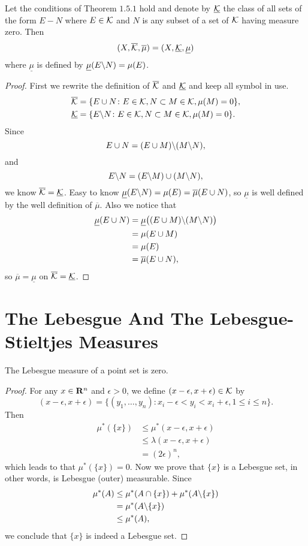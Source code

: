 \begin{pro}%
	Let the conditions of Theorem $1.5.1$ hold and denote by $\underline{\mathcal{K}}$ the class of all sets of the form $E-N$ where $E\in \mathcal{K}$ and $N$ is any subset of a set of $\mathcal{K}$ having measure zero. Then \[(X,\overline{\mathcal{K}},\overline{\mu})=(X,\underline{\mathcal{K}},\underline{\mu})\] where $\underline{\mu}$ is defined by $\underline{\mu}(E\backslash N)=\mu(E)$.
\end{pro}
\begin{proof}
	First we rewrite the definition of $\overline{\mathcal{K}}$ and $\underline{\mathcal{K}}$ and keep all symbol in use.
	\begin{align*}
		\overline{\mathcal{K}}&=\{E\cup N\colon E\in\mathcal{K},N\subset M\in \mathcal{K},\mu(M)=0\},\\
		\underline{\mathcal{K}}&=\{E\backslash N\colon E\in\mathcal{K},N\subset M\in \mathcal{K},\mu(M)=0\}.
	\end{align*}
	Since 
	\[E\cup N=(E\cup M)\backslash(M\backslash N),\]
	and
	\[E\backslash N=(E\backslash M)\cup(M\backslash N),\]
	we know $\overline{\mathcal{K}}=\underline{\mathcal{K}}$. Easy to know $\underline{\mu}(E\backslash N)=\mu(E)=\overline{\mu}(E\cup N)$, so $\underline{\mu}$ is well defined by the well definition of $\overline{\mu}$. Also we notice that
	\begin{align*}
		\underline{\mu}(E\cup N)&=\underline{\mu}\big((E\cup M)\backslash (M\backslash N)\big)\\
								&=\mu(E\cup M)\\
								&=\mu(E)\\
								&=\overline{\mu}(E\cup N),
	\end{align*}
	so $\overline{\mu}=\underline{\mu}$ on $\overline{\mathcal{K}}=\underline{\mathcal{K}}$.
\end{proof}

\section{The Lebesgue And The Lebesgue-Stieltjes Measures}
\begin{pro}%
	The Lebesgue measure of a point set is zero.
\end{pro}
\begin{proof}
	For any $x\in\mathbf{R}^n$ and $\epsilon>0$, we define $(x-\epsilon,x+\epsilon)\in\mathcal{K}$ by
	\[(x-\epsilon,x+\epsilon)=\{(y_1,\dots,y_n)\colon x_i-\epsilon<y_i<x_i+\epsilon,1\leq i\leq n\}.\]
	Then 
	\begin{align*}
		\mu^*(\{x\})&\leq \mu^*(x-\epsilon,x+\epsilon)\\
		&\leq \lambda(x-\epsilon,x+\epsilon)\\
		&=(2\epsilon)^n,
	\end{align*}
	which leads to that $\mu^*(\{x\})=0$. Now we prove that $\{x\}$ is a Lebesgue set, in other words, is Lebesgue (outer) measurable.
	Since
	\begin{align*}
		\mu^*(A)&\leq \mu^*(A\cap\{x\})+\mu^*(A\backslash \{x\})\\
		&=\mu^*(A\backslash \{x\})\\
		&\leq \mu^*(A),
	\end{align*}
	we conclude that $\{x\}$ is indeed a Lebesgue set.
\end{proof}

